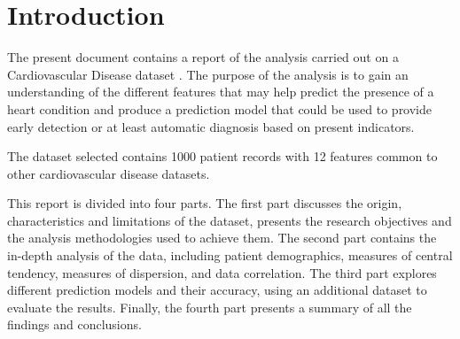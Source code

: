 \section{Introduction}
The present document contains a report of the analysis carried out on a Cardiovascular Disease dataset
\cite{Dataset}. The purpose of the analysis is to gain an understanding of the
different features that may help predict the presence of a heart condition and produce a prediction model
that could be used to provide early detection or at least automatic diagnosis based on present indicators.

The dataset selected contains 1000 patient records with 12 features common to other cardiovascular disease datasets.

This report is divided into four parts. The first part discusses the origin, characteristics and limitations of the dataset,
presents the research objectives and the analysis methodologies used to achieve them. The second part contains the in-depth
analysis of the data, including patient demographics, measures of central tendency, measures of dispersion, and data correlation.
The third part explores different prediction models and their accuracy, using an additional dataset to evaluate the results.
Finally, the fourth part presents a summary of all the findings and conclusions.